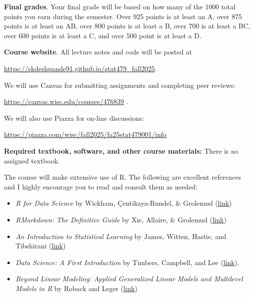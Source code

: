 \documentclass[11pt]{article}
\begin{document}
\textbf{Final grades}. Your final grade will be based on how many of the 1000 total points you earn during the semester.
Over 925 points is at least an A, over 875 points is at least an AB, over 800 points is at least a B, over 700 is at least a BC, over 600 points is at least a C, and over 500 point is at least a D.

\textbf{Course website}. All lecture notes and code will be posted at
\begin{center} \url{https://skdeshpande91.github.io/stat479\_fall2025}. \end{center}
We will use Canvas for submitting assignments and completing peer reviews:
\begin{center} \url{https://canvas.wisc.edu/courses/476839} .\end{center}

We will also use Piazza for on-line discussions:
\begin{center} \url{https://piazza.com/wisc/fall2025/fa25stat479001/info} \end{center}


\textbf{Required textbook, software, and other course materials:} 
There is no assigned textbook. 

The course will make extensive use of \textsf{R}.
The following are excellent references and I highly encourage you to read and consult them as needed:
\begin{itemize}
\item{\textit{R for Data Science} by Wickham, \c{C}entikaya-Rundel, \& Grolemud (\href{https://r4ds.hadley.nz}{link})}
\item{\textit{RMarkdown: The Definitive Guide} by Xie, Allaire, \& Grolemud (\href{https://bookdown.org/yihui/rmarkdown/}{link})}
\item{\textit{An Introduction to Statistical Learning} by James, Witten, Hastie, and Tibshirani (\href{https://www.statlearning.com}{link})}
\item{\textit{Data Science: A First Introduction} by Timbers, Campbell, and Lee (\href{https://datasciencebook.ca}{link}).}
\item{\textit{Beyond Linear Modeling: Applied Generalized Linear Models and Multilevel Models in R} by Roback and Leger (\href{https://bookdown.org/roback/bookdown-BeyondMLR/}{link})}
\end{itemize}
\end{document}
